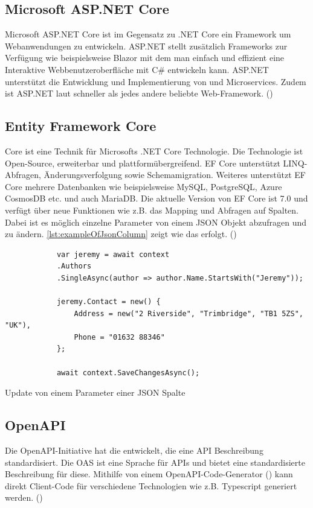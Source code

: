 \documentclass[a4paper, fontsize=11pt, parskip=half, twoside]{scrreprt}
\begin{document}
	\subsection{Microsoft ASP.NET Core}
	Microsoft ASP.NET Core ist im Gegensatz zu .NET Core ein Framework um Webanwendungen zu entwickeln. 
	ASP.NET stellt zusätzlich Frameworks zur Verfügung wie beispielsweise Blazor mit dem man einfach und effizient eine Interaktive Webbenutzeroberfläche mit C\# entwickeln kann.
	ASP.NET unterstützt die Entwicklung und Implementierung von  und Microservices.
	Zudem ist ASP.NET laut \textcite{noauthor_techempower_nodate} schneller als jedes andere beliebte Web-Framework. (\textcite{billwagner_net_nodate})
	
	\subsection{Entity Framework Core}
	 Core ist eine  Technik für Microsofts .NET Core Technologie. 
	Die Technologie ist Open-Source, erweiterbar und plattformübergreifend.
	\ac{EF} Core unterstützt LINQ-Abfragen, Änderungsverfolgung sowie Schemamigration.
	Weiteres unterstützt \ac{EF} Core mehrere Datenbanken wie beispielsweise MySQL, PostgreSQL, Azure CosmosDB etc. und auch MariaDB.
	Die aktuelle Version von \ac{EF} Core ist 7.0 und verfügt über neue Funktionen wie z.B. das Mapping und Abfragen auf  Spalten. 
	Dabei ist es möglich einzelne Parameter von einem \ac{JSON} Objekt abzufragen und zu ändern. 
	\autoref{lst:exampleOfJsonColumn} zeigt wie das erfolgt. (\textcite{billwagner_net_nodate})
	
	\begin{listing}[ht]
		\begin{verbatim}
			var jeremy = await context
			.Authors
			.SingleAsync(author => author.Name.StartsWith("Jeremy"));
			
			jeremy.Contact = new() { 
				Address = new("2 Riverside", "Trimbridge", "TB1 5ZS", "UK"), 
				Phone = "01632 88346" 
			};
		
			await context.SaveChangesAsync();
		\end{verbatim}
		\caption{Update von einem Parameter einer \ac{JSON} Spalte}
		\label{lst:exampleOfJsonColumn}
	\end{listing}
	
	\subsection{OpenAPI}
	Die OpenAPI-Initiative hat die  entwickelt, die eine \ac{API} Beschreibung standardisiert.
	Die \ac{OAS} ist eine Sprache für  \ac{API}s und bietet eine standardisierte Beschreibung für diese.
	Mithilfe von einem OpenAPI-Code-Generator (\textcite{noauthor_openapi_nodate-1}) kann direkt Client-Code für verschiedene Technologien wie z.B. Typescript generiert werden. (\textcite{noauthor_openapi_nodate})
	
\end{document}
